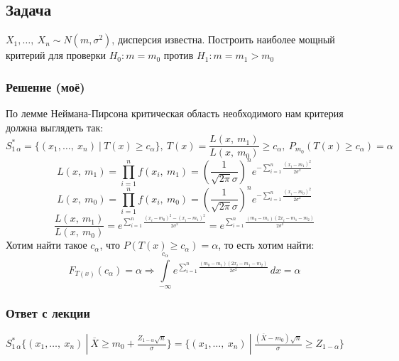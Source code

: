 \documentclass[12pt, a4paper]{article}
\begin{document}
\subsection*{Задача}
$X_1,\dots,\ X_n \sim N(m, \sigma^2)$, дисперсия известна. Построить наиболее мощный критерий для проверки $H_0: m = m_0$ против $H_1: m = m_1 > m_0$
\subsubsection*{Решение (моё)}
По лемме Неймана-Пирсона критическая область необходимого нам критерия должна выглядеть так:
\[S_{1\, \alpha}^* = \{(x_1,\dots,\ x_n)\ |\ T(x) \geq c_{\alpha}\},\ T(x) = \frac{L(x,\ m_1)}{L(x,\ m_0)} \geq c_{\alpha},\ P_{m_0} \left( T(x) \geq c_{\alpha} \right) = \alpha\]
\[L(x,\ m_1) = \prod_{i = 1}^{n} f(x_i,\ m_1) = \left( \frac{1}{\sqrt{2\pi} \sigma} \right)^n e^{-\sum_{i = 1}^{n}\frac{(x_i - m_1)^2}{2\sigma^2}}\]
\[L(x,\ m_0) = \prod_{i = 1}^{n} f(x_i,\ m_0) = \left( \frac{1}{\sqrt{2\pi} \sigma} \right)^n e^{-\sum_{i = 1}^{n}\frac{(x_i - m_0)^2}{2\sigma^2}}\]
\[\frac{L(x,\ m_1)}{L(x,\ m_0)} = e^{\sum_{i = 1}^{n} \frac{(x_i - m_0)^2 - (x_i - m_1)^2}{2\sigma^2}} = e^{\sum_{i = 1}^{n} \frac{(m_0 - m_1)(2x_i - m_1 - m_2)}{2\sigma^2}}\]
Хотим найти такое $c_{\alpha}$, что $P\left( T(x) \geq c_{\alpha} \right) = \alpha$, то есть хотим найти:
\[F_{T(x)}(c_{\alpha}) = \alpha\Rightarrow \int\limits_{-\infty}^{c_{\alpha}} e^{\sum_{i = 1}^{n} \frac{(m_0 - m_1)(2x_i - m_1 - m_2)}{2\sigma^2}}\, dx = \alpha\] 
\subsubsection*{Ответ с лекции}
$S^*_{1\, \alpha} \{(x_1,\dots,\ x_n)\ | \ \overline{X} \geq m_0 + \frac{Z_{1 - \alpha}\sqrt{n}}{\sigma}\} = \{(x_1,\dots,\ x_n)\ |\ \frac{(\overline{X} - m_0)\sqrt{n}}{\sigma} \geq Z_{1 - \alpha}\}$
\end{document}
